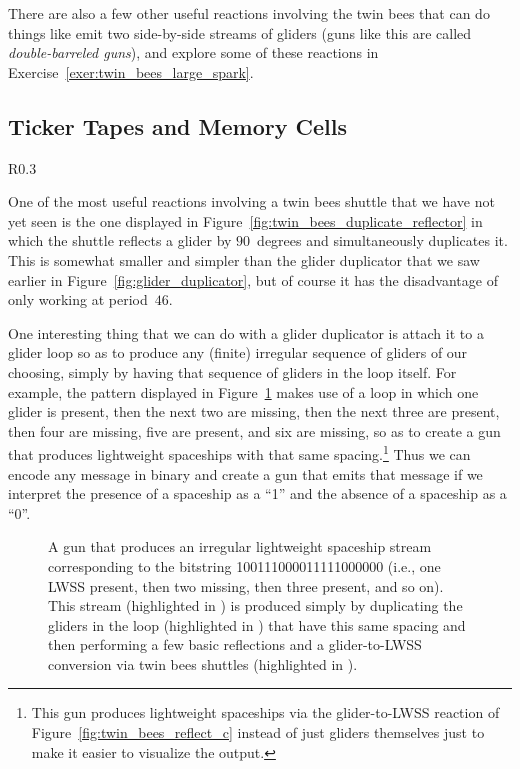There are also a few other useful reactions involving the twin bees that can do things like emit two side-by-side streams of gliders (guns like this are called \emph{double-barreled guns}), and explore some of these reactions in Exercise~\ref{exer:twin_bees_large_spark}.


\subsection{Ticker Tapes and Memory Cells}\label{sec:p46_ticker_tape}

\begin{wrapfigure}{R}{0.3\textwidth}
	\centering
	\caption{A twin bees shuttle reflecting and duplicating a glider.}\label{fig:twin_bees_duplicate_reflector}
\end{wrapfigure}
One of the most useful reactions involving a twin bees shuttle that we have not yet seen is the one displayed in Figure~\ref{fig:twin_bees_duplicate_reflector} in which the shuttle reflects a glider by $90$~degrees and simultaneously duplicates it. This is somewhat smaller and simpler than the glider duplicator that we saw earlier in Figure~\ref{fig:glider_duplicator}, but of course it has the disadvantage of only working at period~$46$.

One interesting thing that we can do with a glider duplicator is attach it to a glider loop so as to produce any (finite) irregular sequence of gliders of our choosing, simply by having that sequence of gliders in the loop itself. For example, the pattern displayed in Figure~\ref{fig:ticker_tape_gun} makes use of a loop in which one glider is present, then the next two are missing, then the next three are present, then four are missing, five are present, and six are missing, so as to create a gun that produces lightweight spaceships with that same spacing.\footnote{This gun produces lightweight spaceships via the glider-to-LWSS reaction of Figure~\ref{fig:twin_bees_reflect_c} instead of just gliders themselves just to make it easier to visualize the output.} Thus we can encode any message in binary and create a gun that emits that message if we interpret the presence of a spaceship as a ``1'' and the absence of a spaceship as a ``0''.

\begin{figure}[!htb]
	\centering
	\caption{A gun that produces an irregular lightweight spaceship stream corresponding to the bitstring 100111000011111000000 (i.e., one LWSS present, then two missing, then three present, and so on). This stream (highlighted in ) is produced simply by duplicating the gliders in the loop (highlighted in ) that have this same spacing and then performing a few basic reflections and a glider-to-LWSS conversion via twin bees shuttles (highlighted in ).}\label{fig:ticker_tape_gun}
\end{figure}

